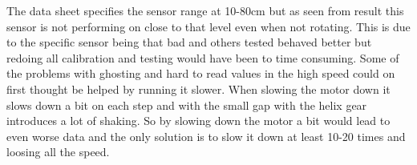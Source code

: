 The data sheet specifies the sensor range at 10-80cm but as seen from result this sensor is not performing on close to that level even when not rotating. This is due to the specific sensor being that bad and others tested behaved better but redoing all calibration and testing would have been to time consuming.\newline
Some of the problems with ghosting and hard to read values in the high speed could on first thought be helped by running it slower. When slowing the motor down it slows down a bit on each step and with the small gap with the helix gear introduces a lot of shaking. So by slowing down the motor a bit would lead to even worse data and the only solution is to slow it down at least 10-20 times and loosing all the speed. 